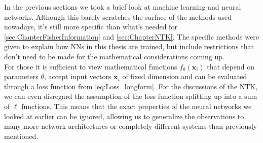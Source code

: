 In the previous sections we took a brief look at machine learning and neural networks. Although this barely scratches the surface of the methods used nowadays, it's still more specific than what's needed for \cref{sec:ChapterFisherInformation} and \cref{sec:ChapterNTK}. The specific methods were given to explain how NNs in this thesis are trained, but include restrictions that don't need to be made for the mathematical considerations coming up.\\
For those it is sufficient to view mathematical functions $f_\theta(\mathbf{x}_i)$ that depend on parameters $\theta$, accept input vectors $\mathbf{x}_i$ of fixed dimension and can be evaluated through a loss function from \cref{eq:Loss_longform}. For the discussions of the NTK, we can even disregard the assumption of the loss function splitting up into a sum of $\ell$ functions. This means that the exact properties of the neural networks we looked at earlier can be ignored, allowing us to generalize the observations to many more network architectures or completely different systems than previously mentioned.